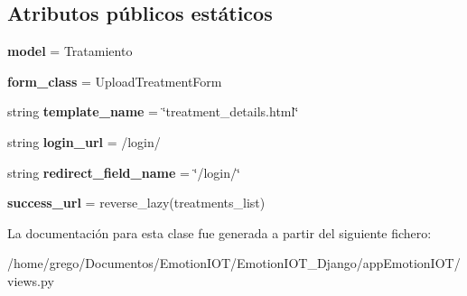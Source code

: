 \subsection*{Atributos públicos estáticos}
\begin{DoxyCompactItemize}
\item 
{\bfseries model} = Tratamiento\hypertarget{classappEmotionIOT_1_1views_1_1Update__treatment_a18ff28263b39c4d88723374bd46da596}{}\label{classappEmotionIOT_1_1views_1_1Update__treatment_a18ff28263b39c4d88723374bd46da596}

\item 
{\bfseries form\+\_\+class} = Upload\+Treatment\+Form\hypertarget{classappEmotionIOT_1_1views_1_1Update__treatment_a990e4792377b7b2b2530d9a33e2a03ea}{}\label{classappEmotionIOT_1_1views_1_1Update__treatment_a990e4792377b7b2b2530d9a33e2a03ea}

\item 
string {\bfseries template\+\_\+name} = \char`\"{}treatment\+\_\+details.\+html\char`\"{}\hypertarget{classappEmotionIOT_1_1views_1_1Update__treatment_a26326183de69418492c4bd45840426b2}{}\label{classappEmotionIOT_1_1views_1_1Update__treatment_a26326183de69418492c4bd45840426b2}

\item 
string {\bfseries login\+\_\+url} = \textquotesingle{}/login/\textquotesingle{}\hypertarget{classappEmotionIOT_1_1views_1_1Update__treatment_a76506c96c0ef4a967945692d565f29f4}{}\label{classappEmotionIOT_1_1views_1_1Update__treatment_a76506c96c0ef4a967945692d565f29f4}

\item 
string {\bfseries redirect\+\_\+field\+\_\+name} = \char`\"{}/login/\char`\"{}\hypertarget{classappEmotionIOT_1_1views_1_1Update__treatment_afc64edd418df9d668e7a277d0d8796cd}{}\label{classappEmotionIOT_1_1views_1_1Update__treatment_afc64edd418df9d668e7a277d0d8796cd}

\item 
{\bfseries success\+\_\+url} = reverse\+\_\+lazy(\textquotesingle{}treatments\+\_\+list\textquotesingle{})\hypertarget{classappEmotionIOT_1_1views_1_1Update__treatment_ae332636483d00e4e18b2bdf597f29180}{}\label{classappEmotionIOT_1_1views_1_1Update__treatment_ae332636483d00e4e18b2bdf597f29180}

\end{DoxyCompactItemize}


La documentación para esta clase fue generada a partir del siguiente fichero\+:\begin{DoxyCompactItemize}
\item 
/home/grego/\+Documentos/\+Emotion\+I\+O\+T/\+Emotion\+I\+O\+T\+\_\+\+Django/app\+Emotion\+I\+O\+T/views.\+py\end{DoxyCompactItemize}
